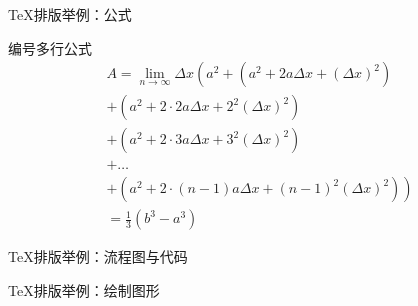 \begin{frame}{\TeX{}排版举例：公式}
  \begin{exampleblock}{编号多行公式}
    \begin{multline}
    A=\lim_{n\rightarrow\infty}\Delta x\left(a^{2}+\left(a^{2}+2a\Delta x+\left(\Delta x\right)^{2}\right)\right.\label{eq:reset}\\
    +\left(a^{2}+2\cdot2a\Delta x+2^{2}\left(\Delta x\right)^{2}\right)\\
    +\left(a^{2}+2\cdot3a\Delta x+3^{2}\left(\Delta x\right)^{2}\right)\\
    +\ldots\\
    \left.+\left(a^{2}+2\cdot(n-1)a\Delta x+(n-1)^{2}\left(\Delta x\right)^{2}\right)\right)\\
    =\frac{1}{3}\left(b^{3}-a^{3}\right)
  \end{multline}
\end{exampleblock}
\end{frame}

\begin{frame}{\TeX{}排版举例：流程图与代码}
  \begin{minipage}[c]{0.4\linewidth}
    \tiny
  \end{minipage}\hspace*{0.05\linewidth}
  \begin{minipage}[c]{0.45\linewidth}
    
  \end{minipage}
\end{frame}

\begin{frame}{\TeX{}排版举例：绘制图形}
  \begin{minipage}[c]{0.45\linewidth}
    
  \end{minipage}\hfil
  \begin{minipage}[c]{0.45\linewidth}
    \centering
    
  \end{minipage}
  \pause
  \vspace*{-0.05\paperheight}
  
  \vspace*{-0.05\paperheight}
  \begin{center}
  \end{center}
\end{frame}
